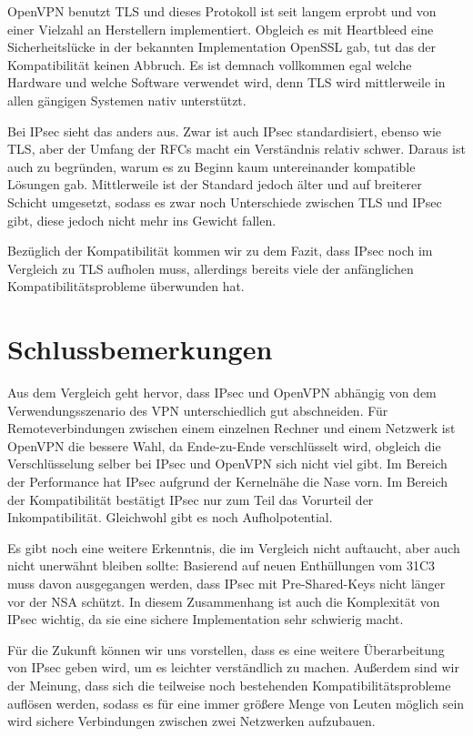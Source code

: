 \documentclass[12pt]{scrartcl}
\begin{document}
OpenVPN benutzt TLS und dieses Protokoll ist seit langem erprobt und von einer Vielzahl an Herstellern implementiert. Obgleich es mit Heartbleed eine Sicherheitslücke in der bekannten Implementation OpenSSL gab, tut das der Kompatibilität keinen Abbruch. Es ist demnach vollkommen egal welche Hardware und welche Software verwendet wird, denn TLS wird mittlerweile in allen gängigen Systemen nativ unterstützt.

Bei IPsec sieht das anders aus. Zwar ist auch IPsec standardisiert, ebenso wie TLS, aber der Umfang der RFCs macht ein Verständnis relativ schwer. Daraus ist auch zu begründen, warum es zu Beginn kaum untereinander kompatible Lösungen gab\cite{Alshamsi2005}. Mittlerweile ist der Standard jedoch älter und auf breiterer Schicht umgesetzt, sodass es zwar noch Unterschiede zwischen TLS und IPsec gibt, diese jedoch nicht mehr ins Gewicht fallen.

Bezüglich der Kompatibilität kommen wir zu dem Fazit, dass IPsec noch im Vergleich zu TLS aufholen muss, allerdings bereits viele der anfänglichen Kompatibilitätsprobleme überwunden hat.

\section{Schlussbemerkungen}
Aus dem Vergleich geht hervor, dass IPsec und OpenVPN abhängig von dem Verwendungsszenario des VPN unterschiedlich gut abschneiden. Für Remoteverbindungen zwischen einem einzelnen Rechner und einem Netzwerk ist OpenVPN die bessere Wahl, da Ende-zu-Ende verschlüsselt wird, obgleich die Verschlüsselung selber bei IPsec und OpenVPN sich nicht viel gibt. Im Bereich der Performance hat IPsec aufgrund der Kernelnähe die Nase vorn. Im Bereich der Kompatibilität bestätigt IPsec nur zum Teil das Vorurteil der Inkompatibilität. Gleichwohl gibt es noch Aufholpotential.

Es gibt noch eine weitere Erkenntnis, die im Vergleich nicht auftaucht, aber auch nicht unerwähnt bleiben sollte: Basierend auf neuen Enthüllungen vom 31C3 muss davon ausgegangen werden, dass IPsec mit Pre-Shared-Keys nicht länger vor der NSA schützt. In diesem Zusammenhang ist auch die Komplexität von IPsec wichtig, da sie eine sichere Implementation sehr schwierig macht.

Für die Zukunft können wir uns vorstellen, dass es eine weitere Überarbeitung von IPsec geben wird, um es leichter verständlich zu machen. Außerdem sind wir der Meinung, dass sich die teilweise noch bestehenden Kompatibilitätsprobleme auflösen werden, sodass es für eine immer größere Menge von Leuten möglich sein wird sichere Verbindungen zwischen zwei Netzwerken aufzubauen.
\end{document}
